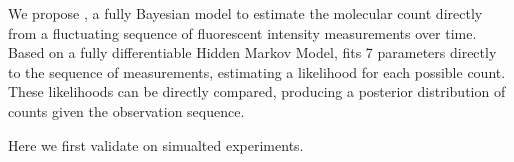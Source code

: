 We propose \ours, a fully Bayesian model to estimate the molecular 
  count directly from a fluctuating sequence of fluorescent intensity measurements over time.
  Based on a fully differentiable Hidden Markov Model, \ours fits 7 parameters
  directly to the sequence of measurements, estimating a likelihood for each possible count. 
  These likelihoods can be directly compared, producing a posterior distribution of counts 
  given the observation sequence. 

Here we first validate \ours on simualted experiments.

